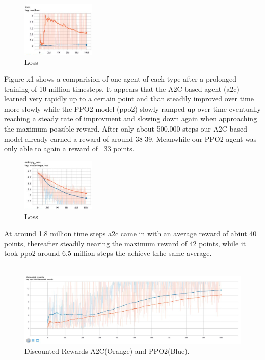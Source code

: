 \documentclass[sigconf]{acmart}
\begin{document}
\begin{figure}
 \includegraphics[width=35mm]{loss.png}
  \caption{Loss}
  \label{fig:loss}
\end{figure}
Figure x1 shows a comparision of one agent of each type after a prolonged training of 10 million timesteps.  It appears that the A2C based agent (a2c) learned very rapidly up to a certain point and than steadily improved over time more slowly while the PPO2 model (ppo2) slowly ramped up over time eventually reaching a steady rate of improvment and slowing down again when approaching the maximum possible reward. After only about 500.000 steps our A2C based model already earned a reward of around 38-39. Meanwhile our PPO2 agent was only able to again a reward of ~33 points.
\\
\begin{figure}
 \includegraphics[width=35mm]{eloss.png}
  \caption{Loss}
  \label{fig:loss}
\end{figure}
At around 1.8 million time steps a2c came in with an average reward of abiut 40 points, thereafter steadily nearing the maximum reward of 42 points, while it took ppo2 around 6.5 million steps the achieve thhe same average.
\\
\\
\begin{figure}
 \centering
  \includegraphics[width=\textwidth]{discounted_reward} 
  \caption{Discounted Rewards A2C(Orange) and PPO2(Blue).}
  \label{fig:reward2}
\end{figure}
\end{document}

